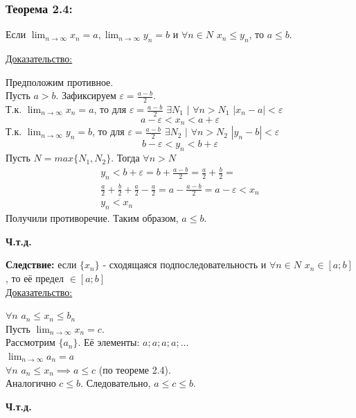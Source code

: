 \documentclass[12pt]{article}
\def\posl#1#2{\{#1_{#2}\}}
\begin{document}
    \subsubsection*{Теорема 2.4:}
    Если $\lim_{n\to\infty}x_n = a, \lim_{n\to\infty}y_n = b$ и $\forall n \in N$ $x_n \le y_n$, то $a \le b$.\par\noindent
    \underline{Доказательство:} 
    \begin{adjustwidth}{1.5em}{1.5em}
        Предположим противное.\\
        Пусть $a > b$. Зафиксируем $\varepsilon = \frac{a-b}{2}$.\\
        Т.к. $\lim_{n\to\infty} x_n = a$, то для $\varepsilon = \frac{a-b}{2}$ $\exists N_{1}$ $\big|$ $\forall n > N_{1}$ $|x_n - a| < \varepsilon$
        \[
            a - \varepsilon < x_n < a + \varepsilon
        \]
        Т.к. $\lim_{n\to\infty} y_n = b$, то для $\varepsilon = \frac{a-b}{2}$ $\exists N_{2}$ $\big|$ $\forall n > N_{2}$ $|y_n - b| < \varepsilon$
        \[
            b - \varepsilon < y_n < b + \varepsilon
        \]
        Пусть $N = max\{N_{1}, N_{2}\}$. Тогда $\forall n > N$
        \begin{gather*}
            y_n < b + \varepsilon = b + \frac{a-b}{2} = \frac{a}{2} + \frac{b}{2} =\\
            \frac{a}{2} + \frac{b}{2} + \frac{a}{2} - \frac{a}{2} = a - \frac{a-b}{2} = a - \varepsilon < x_n\\
            y_n < x_n
        \end{gather*}
        Получили противоречие. Таким образом, $a \le b$.
        \begin{center}
            \textbf{Ч.т.д.}
        \end{center}        
    \end{adjustwidth}
    
    \noindent \textbf{Следствие:} если $\posl{x}{n}$ - сходящаяся подпоследовательность и $\forall n \in N$ $x_n \in [a;b]$, то её предел $\in [a;b]$\\
    \underline{Доказательство:} 
    \begin{adjustwidth}{1.5em}{1.5em}
        $\forall n$ $a_{n} \le x_n \le b_{n}$\\
        Пусть $\lim_{n\to\infty}x_n = c$.\\
        Рассмотрим $\posl{a}{n}$. Её элементы: $a; a; a; a; \dots$\\
        $\lim_{n\to\infty}a_{n} = a$\\
        $\forall n$ $a_{n} \le x_n \implies a \le c$ (по теореме 2.4).\\
        Аналогично $c \le b$. Следовательно, $a \le c \le b$.
        \begin{center}
            \textbf{Ч.т.д.}
        \end{center}
    \end{adjustwidth}
\end{document}
